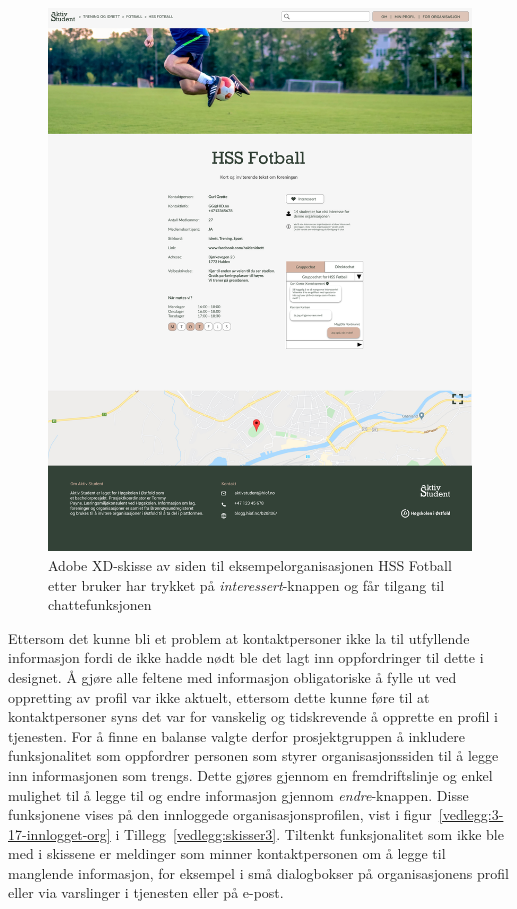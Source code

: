 \begin{figure}[H]
\centering
\includegraphics[width=.7\textwidth]{Illustrasjoner/Skisser-pdf/3.0/3-6-organisasjonsside-trykket-interessert.pdf}
\caption{Adobe XD-skisse av siden til eksempelorganisasjonen HSS Fotball etter bruker har trykket på {\em interessert}-knappen og får tilgang til chattefunksjonen}
\label{fig:3-6-org-trykket-interessert}
\end{figure}

Ettersom det kunne bli et problem at kontaktpersoner ikke la til utfyllende informasjon fordi de ikke hadde nødt ble det lagt inn oppfordringer til dette i designet. Å gjøre alle feltene med informasjon obligatoriske å fylle ut ved oppretting av profil var ikke aktuelt, ettersom dette kunne føre til at kontaktpersoner syns det var for vanskelig og tidskrevende å opprette en profil i tjenesten. For å finne en balanse valgte derfor prosjektgruppen å inkludere funksjonalitet som oppfordrer personen som styrer organisasjonssiden til å legge inn informasjonen som trengs. Dette gjøres gjennom en fremdriftslinje og enkel mulighet til å legge til og endre informasjon gjennom {\em endre}-knappen. Disse funksjonene vises på den innloggede organisasjonsprofilen, vist i figur~\ref{vedlegg:3-17-innlogget-org} i Tillegg~\ref{vedlegg:skisser3}. Tiltenkt funksjonalitet som ikke ble med i skissene er meldinger som minner kontaktpersonen om å legge til manglende informasjon, for eksempel i små dialogbokser på organisasjonens profil eller via varslinger i tjenesten eller på e-post.


